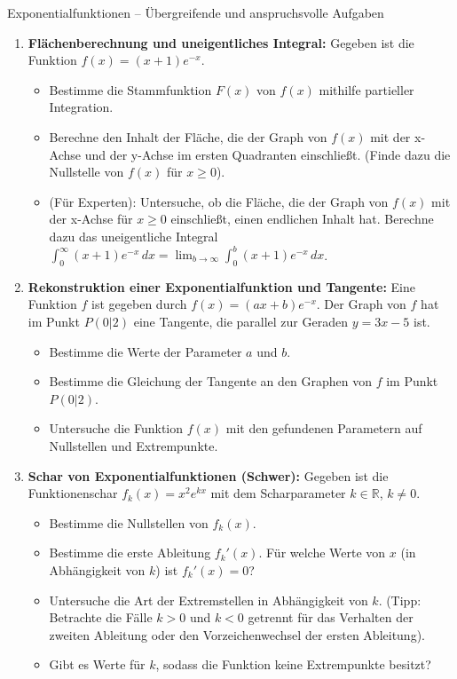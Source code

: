 \begin{aufgabenumgebung}{Exponentialfunktionen – Übergreifende und anspruchsvolle Aufgaben}
\begin{enumerate}
    \item \textbf{Flächenberechnung und uneigentliches Integral:}
        Gegeben ist die Funktion $f(x) = (x+1)e^{-x}$.
        \begin{itemize}
            \item Bestimme die Stammfunktion $F(x)$ von $f(x)$ mithilfe partieller Integration.
            \item Berechne den Inhalt der Fläche, die der Graph von $f(x)$ mit der x-Achse und der y-Achse im ersten Quadranten einschließt. (Finde dazu die Nullstelle von $f(x)$ für $x \ge 0$).
            \item (Für Experten): Untersuche, ob die Fläche, die der Graph von $f(x)$ mit der x-Achse für $x \ge 0$ einschließt, einen endlichen Inhalt hat. Berechne dazu das uneigentliche Integral $\int_0^\infty (x+1)e^{-x} \,dx = \lim_{b \to \infty} \int_0^b (x+1)e^{-x} \,dx$.
        \end{itemize}

    \item \textbf{Rekonstruktion einer Exponentialfunktion und Tangente:}
        Eine Funktion $f$ ist gegeben durch $f(x) = (ax+b)e^{-x}$. Der Graph von $f$ hat im Punkt $P(0|2)$ eine Tangente, die parallel zur Geraden $y=3x-5$ ist.
        \begin{itemize}
            \item Bestimme die Werte der Parameter $a$ und $b$.
            \item Bestimme die Gleichung der Tangente an den Graphen von $f$ im Punkt $P(0|2)$.
            \item Untersuche die Funktion $f(x)$ mit den gefundenen Parametern auf Nullstellen und Extrempunkte.
        \end{itemize}

    \item \textbf{Schar von Exponentialfunktionen (Schwer):}
        Gegeben ist die Funktionenschar $f_k(x) = x^2 e^{kx}$ mit dem Scharparameter $k \in \mathbb{R}$, $k \neq 0$.
        \begin{itemize}
            \item Bestimme die Nullstellen von $f_k(x)$.
            \item Bestimme die erste Ableitung $f_k'(x)$. Für welche Werte von $x$ (in Abhängigkeit von $k$) ist $f_k'(x)=0$?
            \item Untersuche die Art der Extremstellen in Abhängigkeit von $k$. (Tipp: Betrachte die Fälle $k>0$ und $k<0$ getrennt für das Verhalten der zweiten Ableitung oder den Vorzeichenwechsel der ersten Ableitung).
            \item Gibt es Werte für $k$, sodass die Funktion keine Extrempunkte besitzt?
        \end{itemize}
\end{enumerate}
\end{aufgabenumgebung}


